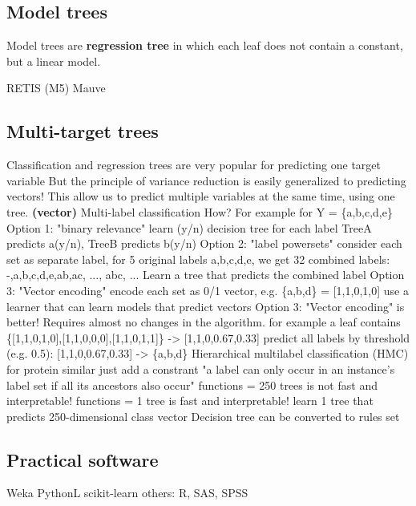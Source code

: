 \subsection{Model trees}
Model trees are \textbf{regression tree} in which each leaf does not contain a constant, but a linear model.
\begin{outline}
    \1 RETIS (M5)
    \1 Mauve
\end{outline}

\subsection{Multi-target trees}
\begin{outline}
    \1 Classification and regression trees are very popular for predicting one target variable
    \1 But the principle of variance reduction is easily generalized to predicting vectors!
    \1 This allow us to predict multiple variables at the same time, using one tree. \textbf{(vector)}
    \1 Multi-label classification
        \2 How? For example for Y = \{a,b,c,d,e\}
        \2 Option 1: "binary relevance"
            \3 learn (y/n) decision tree for each label
            \3 TreeA predicts a(y/n), TreeB predicts b(y/n)
        \2 Option 2: "label powersets" 
            \3 consider each set as separate label, for 5 original labels a,b,c,d,e, we get 32 combined labels: -,a,b,c,d,e,ab,ac, ..., abc, ...
            \3 Learn a tree that predicts the combined label
        \2 Option 3: "Vector encoding"
            \3 encode each set as 0/1 vector, e.g. \{a,b,d\} = [1,1,0,1,0]
            \3 use a learner that can learn models that predict vectors
        \2 Option 3: "Vector encoding" is better! Requires almost no changes in the algorithm.
            \3 for example a leaf contains \{[1,1,0,1,0],[1,1,0,0,0],[1,1,0,1,1]\} -> [1,1,0,0.67,0.33]
            \3 predict all labels by threshold (e.g. 0.5): [1,1,0,0.67,0.33] -> \{a,b,d\}
    \1 Hierarchical multilabel classification (HMC)
        \2 for protein
        \2 similar just add a constrant "a label can only occur in an instance's label set if all its ancestors also occur"
             functions = 250 trees is not fast and interpretable!
             functions = 1 tree is fast and interpretable!
            \3 learn 1 tree that predicts 250-dimensional class vector
        \2 Decision tree can be converted to rules set
\end{outline}

\subsection{Practical software}
\begin{outline}
    \1 Weka
    \1 PythonL scikit-learn
    \1 others: R, SAS, SPSS
\end{outline}

